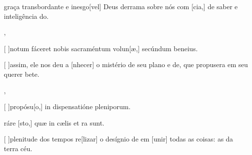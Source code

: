 {    {\item {} graça transbordante e inesgo[vel] Deus derrama sobre nós com [cia,] de saber e inteligência do.~\Antiphona},
  {\item {}[ ]{no}tum fáceret nobis sacraméntum volun[æ,] secúndum beneius.~\Antiphona}%
    {\item {}[ ]{as}sim, ele nos deu a [nhecer] o mistério de seu plano e de, que propusera em seu querer bete.~\Antiphona},
  {\item {}[ ]{pro}pósu[o,] in dispensatióne pleniporum.
      \item {}ráre [sto,] quæ in cælis et ra sunt.~\Antiphona}%
    {\item {}[ ]{ple}nitude dos tempos re[lizar] o desígnio de em [unir] todas as coisas: as da terra  céu.~\Antiphona}
}